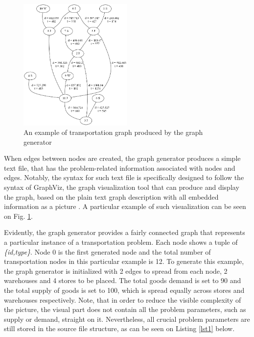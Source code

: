 \documentclass[journal,onecolumn]{IEEEtran}
\begin{document}
\begin{figure}[h]
	\centering
  	\includegraphics[width=0.5\textwidth]{img/img1.png}
  	\caption{An example of transportation graph produced by the graph generator}	
  	\label{fig:img1}
\end{figure}

When edges between nodes are created, the graph generator produces a simple text file, that has the problem-related information associated with nodes and edges. Notably, the syntax for such text file is specifically designed to follow the syntax of GraphViz, the graph visualization tool that can produce and display the graph, based on the plain text graph description with all embedded information as a picture \cite{web:web}. A particular example of such visualization can be seen on Fig. \ref{fig:img1}.



Evidently, the graph generator provides a fairly connected graph that represents a particular instance of a transportation problem. Each node shows a tuple of \textit{\{id,type\}}. Node 0 is the first generated node and the total number of transportation nodes in this particular example is 12. To generate this example, the graph generator is initialized with 2 edges to spread from each node, 2 warehouses and 4 stores to be placed. The total goods demand is set to 90 and the total supply of goods is set to 100, which is spread equally across stores and warehouses respectively. Note, that in order to reduce the visible complexity of the picture, the visual part does not contain all the problem parameters, such as supply or demand, straight on it. Nevertheless, all crucial problem parameters are still stored in the source file structure, as can be seen on Listing \ref{lst1} below.

\lstset{basicstyle=\ttfamily}

\end{document}
